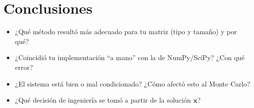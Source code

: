 \section{Conclusiones}
\label{sec:conclusion}

\begin{itemize}
	\item ¿Qué método resultó más adecuado para tu matriz (tipo y tamaño) y por qué?
	\item ¿Coincidió tu implementación ``a mano'' con la de NumPy/SciPy? ¿Con qué error?
	\item ¿El sistema está bien o mal condicionado? ¿Cómo afectó esto al Monte Carlo?
	\item ¿Qué decisión de ingeniería se tomó a partir de la solución $\mathbf{x}$?
\end{itemize}
